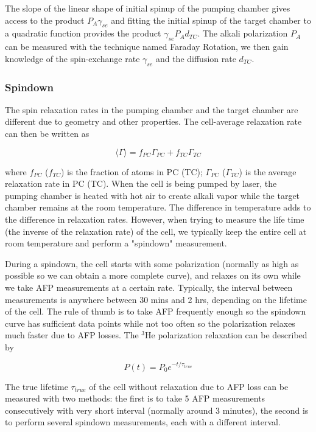 The slope of the linear shape of initial spinup of the pumping chamber gives access to the product $P_{A}\gamma_{se}$ and fitting the initial spinup of the target chamber to a quadratic function provides the product $\gamma_{se}P_{A}d_{TC}$. The alkali polarization $P_{A}$ can be measured with the technique named Faraday Rotation, we then gain knowledge of the spin-exchange rate $\gamma_{se}$ and the diffusion rate $d_{TC}$.

\subsubsection{Spindown}

The spin relaxation rates in the pumping chamber and the target chamber are different due to geometry and other properties. The cell-average relaxation rate can then be written as

\begin{equation}
\langle \Gamma \rangle=f_{PC}\Gamma_{PC}+f_{TC}\Gamma_{TC}
\end{equation}

where $f_{PC}$ ($f_{TC}$) is the fraction of atoms in PC (TC); $\Gamma_{PC}$ ($\Gamma_{TC}$) is the average relaxation rate in PC (TC). When the cell is being pumped by laser, the pumping chamber is heated with hot air to create alkali vapor while the target chamber remains at the room temperature. The difference in temperature adds to the difference in relaxation rates. However, when trying to measure the life time (the inverse of the relaxation rate) of the cell, we typically keep the entire cell at room temperature and perform a "spindown" measurement. 

During a spindown, the cell starts with some polarization (normally as high as possible so we can obtain a more complete curve), and relaxes on its own while we take AFP measurements at a certain rate. Typically, the interval between measurements is anywhere between 30 mins and 2 hrs, depending on the lifetime of the cell. The rule of thumb is to take AFP frequently enough so the spindown curve has sufficient data points while not too often so the polarization relaxes much faster due to AFP losses. The $^{3}$He polarization relaxation can be described by

\begin{equation}\label{Spindown}
P(t)=P_{0}e^{-t/\tau_{true}}
\end{equation}

The true lifetime $\tau_{true}$ of the cell without relaxation due to AFP loss can be measured with two methods: the first is to take 5 AFP measurements consecutively with very short interval (normally around 3 minutes), the second is to perform several spindown measurements, each with a different interval. 


